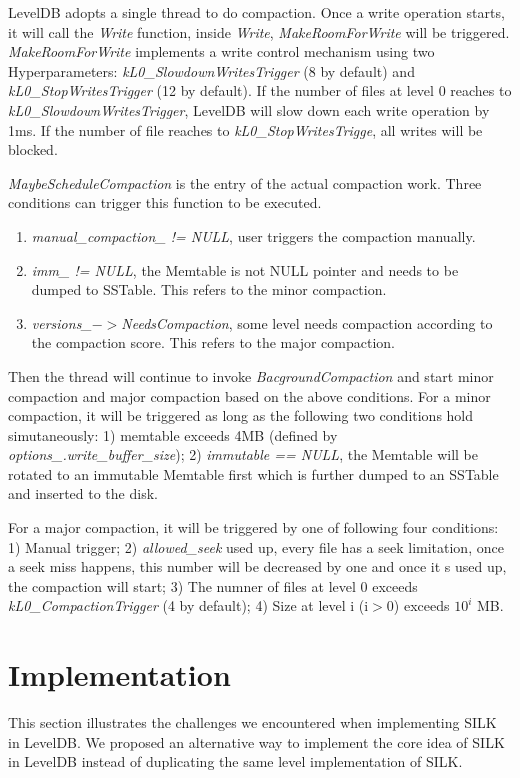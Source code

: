 \documentclass[letter,twocolumn,10pt]{article}
\begin{document}
LevelDB adopts a single thread to do compaction. Once a write operation starts, it will call the \textit{Write} function, inside \textit{Write}, \textit{MakeRoomForWrite} will be triggered. \textit{MakeRoomForWrite} implements a write control mechanism using two Hyperparameters: \textit{kL0\_SlowdownWritesTrigger} (8 by default) and \textit{kL0\_StopWritesTrigger} (12 by default). If the number of files at level 0 reaches to \textit{kL0\_SlowdownWritesTrigger}, LevelDB will slow down each write operation by 1ms. If the number of file reaches to \textit{kL0\_StopWritesTrigge}, all writes will be blocked. 

\textit{MaybeScheduleCompaction} is the entry of the actual compaction work. Three conditions can trigger this function to be executed.
\begin{enumerate}
\item \textit{manual\_compaction\_ != NULL}, user triggers the compaction manually.
\item \textit{imm\_ != NULL}, the Memtable is not NULL pointer and needs to be dumped to SSTable. This refers to the minor compaction.
\item \textit{versions\_$-$$>$NeedsCompaction}, some level needs compaction according to the compaction score. This refers to the major compaction.
\end{enumerate}

Then the thread will continue to invoke \textit{BacgroundCompaction} and start minor compaction and major compaction based on the above conditions.
For a minor compaction, it will be triggered as long as the following two conditions hold simutaneously: 1) memtable exceeds 4MB (defined by \textit{options\_.write\_buffer\_size}); 2) \textit{immutable == NULL}, the Memtable will be rotated to an immutable Memtable first which is further dumped to an SSTable and inserted to the disk.
 
For a major compaction, it will be triggered by one of following four conditions: 1) Manual trigger; 2) \textit{allowed\_seek} used up, every file has a seek limitation, once a seek miss happens, this number will be decreased by one and once it s used up, the compaction will start; 3) The numner of files at level 0 exceeds \textit{kL0\_CompactionTrigger} (4 by default); 4) Size at level i (i$>$0) exceeds $10^i$ MB.
\section{Implementation}
\label{sec:implementaion}
This section illustrates the challenges we encountered when implementing SILK in LevelDB. We proposed an alternative way to implement the core idea of SILK in LevelDB instead of duplicating the same level implementation of SILK.
 
\end{document}
